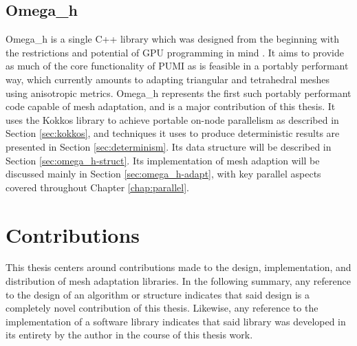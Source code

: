 \subsection{Omega\_h}

Omega\_h is a single C++ library which was designed from the beginning
with the restrictions and potential of GPU programming in mind
\cite{osh_github}.
It aims to provide as much of the core functionality of PUMI as
is feasible in a portably performant way, which currently
amounts to adapting triangular and tetrahedral meshes using anisotropic
metrics.
Omega\_h represents the first such portably performant code capable
of mesh adaptation, and is a major contribution of this thesis.
It uses the Kokkos library to achieve portable on-node parallelism
as described in Section \ref{sec:kokkos}, and techniques
it uses to produce deterministic results are presented
in Section \ref{sec:determinism}.
Its data structure will be described in Section \ref{sec:omega_h-struct}.
Its implementation of mesh adaption will be discussed mainly
in Section \ref{sec:omega_h-adapt}, with key parallel aspects
covered throughout Chapter \ref{chap:parallel}.

\section{Contributions}

This thesis centers around contributions made to the design,
implementation, and distribution of mesh adaptation libraries.
In the following summary, any reference to the design of an
algorithm or structure indicates that said design is a completely novel
contribution of this thesis.
Likewise, any reference to the implementation of a software
library indicates that said library was developed in its entirety
by the author in the course of this thesis work.

